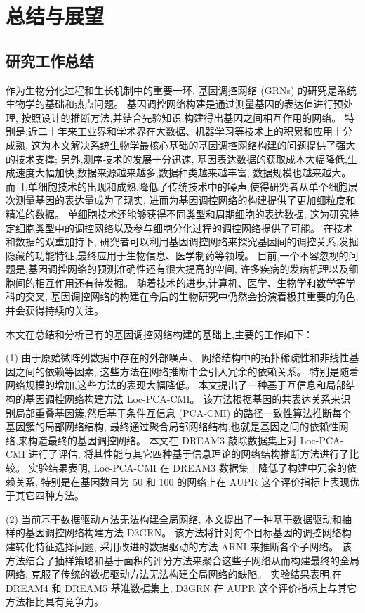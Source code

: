 \section{总结与展望}

\subsection{研究工作总结}

作为生物分化过程和生长机制中的重要一环,
基因调控网络 (GRNs) 的研究是系统生物学的基础和热点问题。
基因调控网络构建是通过测量基因的表达值进行预处理,
按照设计的推断方法,并结合先验知识,构建得出基因之间相互作用的网络。
特别是,近二十年来工业界和学术界在大数据、机器学习等技术上的积累和应用十分成熟,
这为本文解决系统生物学最核心基础的基因调控网络构建的问题提供了强大的技术支撑;
另外,测序技术的发展十分迅速,
基因表达数据的获取成本大幅降低,生成速度大幅加快,数据来源越来越多,数据种类越来越丰富, 数据规模也越来越大。
而且,单细胞技术的出现和成熟,降低了传统技术中的噪声,使得研究者从单个细胞层次测量基因的表达量成为了现实,
进而为基因调控网络的构建提供了更加细粒度和精准的数据。
单细胞技术还能够获得不同类型和周期细胞的表达数据,
这为研究特定细胞类型中的调控网络以及参与细胞分化过程的调控网络提供了可能。
在技术和数据的双重加持下,
研究者可以利用基因调控网络来探究基因间的调控关系,发掘隐藏的功能特征,最终应用于生物信息、医学制药等领域。
目前,一个不容忽视的问题是,基因调控网络的预测准确性还有很大提高的空间,
许多疾病的发病机理以及细胞间的相互作用还有待发掘。
随着技术的进步,计算机、医学、生物学和数学等学科的交叉,
基因调控网络的构建在今后的生物研究中仍然会扮演着极其重要的角色,并会获得持续的关注。

本文在总结和分析已有的基因调控网络构建的基础上,主要的工作如下：

(1) 由于原始微阵列数据中存在的外部噪声、
网络结构中的拓扑稀疏性和非线性基因之间的依赖等因素,
这些方法在网络推断中会引入冗余的依赖关系。
特别是随着网络规模的增加,这些方法的表现大幅降低。
本文提出了一种基于互信息和局部结构的基因调控网络构建方法 Loc-PCA-CMI。
该方法根据基因的共表达关系来识别局部重叠基因簇,然后基于条件互信息 (PCA-CMI) 的路径一致性算法推断每个基因簇的局部网络结构,
最终通过聚合局部网络结构,也就是基因之间的依赖性网络,来构造最终的基因调控网络。
本文在 DREAM3 敲除数据集上对 Loc-PCA-CMI 进行了评估,
将其性能与其它四种基于信息理论的网络结构推断方法进行了比较。
实验结果表明, Loc-PCA-CMI 在 DREAM3 数据集上降低了构建中冗余的依赖关系,
特别是在基因数目为 50 和 100 的网络上在 AUPR 这个评价指标上表现优于其它四种方法。

(2) 当前基于数据驱动方法无法构建全局网络,
本文提出了一种基于数据驱动和抽样的基因调控网络构建方法 D3GRN。
该方法将针对每个目标基因的调控网络构建转化特征选择问题,
采用改进的数据驱动的方法 ARNI 来推断各个子网络。
该方法结合了抽样策略和基于面积的评分方法来聚合这些子网络从而构建最终的全局网络,
克服了传统的数据驱动方法无法构建全局网络的缺陷。
实验结果表明,在 DREAM4 和 DREAM5 基准数据集上,
 D3GRN 在 AUPR 这个评价指标上与其它方法相比具有竞争力。

